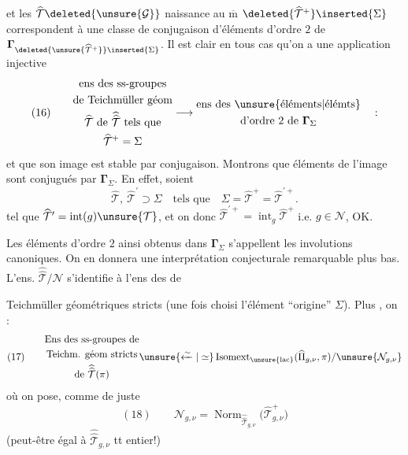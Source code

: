 

et les $\widehat{\mathcal{T}}\deleted{\unsure{\mathcal G}}$  naissance au $\overline{\mathrm m}$ $\deleted{\widehat{\mathcal{T}}^{+}}\inserted{\Sigma}$ correspondent  à une classe de conjugaison d'éléments d'ordre $2$ de $\boldsymbol{\Gamma}_{\deleted{\unsure{\widehat{\mathcal{T}}^{+}}}\inserted{\Sigma}}$. Il est clair  en tous cas qu'on a une application injective
\[
(16)\qquad
\begin{gathered}
\text{ens des ss-groupes}\\
\text{de Teichmüller géom}\\
\widehat{\mathcal{T}}\text{ de }\widehat{\widehat{\mathcal{T}}}\text{ tels que}\\
\widehat{\mathcal{T}}^{+}=\Sigma
\end{gathered}
\longrightarrow
\begin{gathered}
\text{ens des }\unsure{\text{éléments}|\text{élémts}}\\
\text{d'ordre }2\text{ de }\boldsymbol{\Gamma}_{\Sigma}
\end{gathered}
\quad :
\]
et que son image est stable par conjugaison. Montrons que  éléments de l'image sont conjugués par $\boldsymbol{\Gamma}_{\Sigma}$. En effet, soient
\[
\widehat{\mathcal{T}},\ \widehat{\mathcal{T}}^{\prime}\supset\Sigma
\quad\text{tels que}\quad
\Sigma=\widehat{\mathcal{T}}^{+}=\widehat{\mathcal{T}}^{\prime+}.
\]
tel que
$\widehat{\mathcal{T}}^{\prime}=\operatorname{int}(g)\unsure{\mathcal{T}}$,
et on  donc
$\widehat{\mathcal{T}}^{\prime+}=\operatorname{int}_{g}\widehat{\mathcal{T}}^{+}$
i.e. $g\in\mathcal{N}$, OK.

Les éléments d'ordre $2$ ainsi obtenus dans $\boldsymbol{\Gamma}_{\Sigma}$ s'appellent les involutions canoniques. On en donnera une interprétation conjecturale remarquable plus bas. L'ens. $\widehat{\widehat{\mathcal{T}}}/\mathcal{N}$ s'identifie à l'ens des  de



Teichmüller géométriques stricts (une fois choisi l'élément ``origine'' $\Sigma$). Plus , on :
\[
(17)\qquad
\begin{gathered}
\text{Ens des ss-groupes de}\\
\text{Teichm. géom stricts}\\
\text{de }\widehat{\widehat{\mathcal{T}}}(\pi)
\end{gathered}
\unsure{\xleftarrow{\sim}|\simeq}
\operatorname{Isomext}_{\unsure{\mathrm{lac}}}
(\widehat{\Pi}_{g,\nu},\pi)/\unsure{\mathcal{N}_{g,\nu}}
\]
où on pose, comme de juste
\[
(18)\qquad
\mathcal{N}_{g,\nu}
=\operatorname{Norm}_{\widehat{\widehat{\mathcal{T}}}_{g,\nu}}
\bigl(\widehat{\mathcal{T}}_{g,\nu}^{+}\bigr)
\]
(peut-être égal à $\widehat{\widehat{\mathcal{T}}}_{g,\nu}$ tt entier!)

